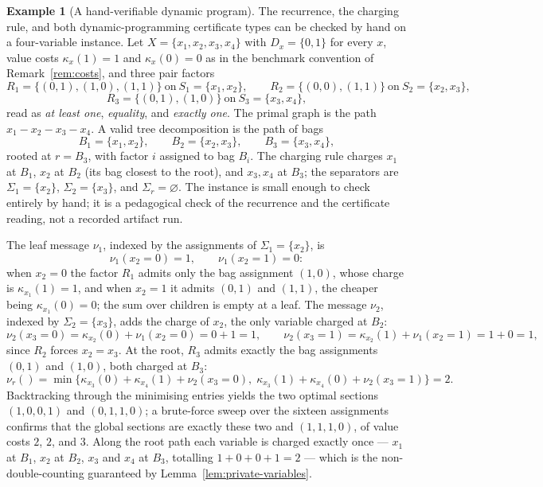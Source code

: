 \documentclass[11pt]{article}
\theoremstyle{plain}
\theoremstyle{definition}
\newtheorem{example}[theorem]{Example}
\theoremstyle{remark}
\begin{document}
\begin{example}[A hand-verifiable dynamic program]
\label{ex:dp-micro}
The recurrence, the charging rule, and both dynamic-programming certificate
types can be checked by hand on a four-variable instance.  Let
\(X=\{x_1,x_2,x_3,x_4\}\) with \(D_x=\{0,1\}\) for every \(x\), value
costs \(\kappa_x(1)=1\) and \(\kappa_x(0)=0\) as in the benchmark
convention of Remark~\ref{rem:costs}, and three pair factors
\[
  R_1=\{(0,1),(1,0),(1,1)\}\ \text{on}\ S_1=\{x_1,x_2\},
  \qquad
  R_2=\{(0,0),(1,1)\}\ \text{on}\ S_2=\{x_2,x_3\},
\]
\[
  R_3=\{(0,1),(1,0)\}\ \text{on}\ S_3=\{x_3,x_4\},
\]
read as \emph{at least one}, \emph{equality}, and \emph{exactly one}.  The
primal graph is the path \(x_1{-}x_2{-}x_3{-}x_4\).  A valid tree
decomposition is the path of bags
\[
  B_1=\{x_1,x_2\},\qquad B_2=\{x_2,x_3\},\qquad B_3=\{x_3,x_4\},
\]
rooted at \(r=B_3\), with factor \(i\) assigned to bag \(B_i\).  The
charging rule charges \(x_1\) at \(B_1\), \(x_2\) at \(B_2\) (its bag
closest to the root), and \(x_3,x_4\) at \(B_3\); the separators are
\(\Sigma_1=\{x_2\}\), \(\Sigma_2=\{x_3\}\), and \(\Sigma_r=\varnothing\).
The instance is small enough to check entirely by hand; it is a pedagogical
check of the recurrence and the certificate reading, not a recorded
artifact run.

The leaf message \(\nu_1\), indexed by the assignments of
\(\Sigma_1=\{x_2\}\), is
\[
  \nu_1(x_2{=}0)=1,\qquad \nu_1(x_2{=}1)=0:
\]
when \(x_2=0\) the factor \(R_1\) admits only the bag assignment
\((1,0)\), whose charge is \(\kappa_{x_1}(1)=1\), and when
\(x_2=1\) it admits \((0,1)\) and \((1,1)\), the cheaper being
\(\kappa_{x_1}(0)=0\); the sum over children is empty at a leaf.  The
message \(\nu_2\), indexed by \(\Sigma_2=\{x_3\}\), adds the charge of
\(x_2\), the only variable charged at \(B_2\):
\[
  \nu_2(x_3{=}0)=\kappa_{x_2}(0)+\nu_1(x_2{=}0)=0+1=1,
  \qquad
  \nu_2(x_3{=}1)=\kappa_{x_2}(1)+\nu_1(x_2{=}1)=1+0=1,
\]
since \(R_2\) forces \(x_2=x_3\).  At the root, \(R_3\) admits exactly the
bag assignments \((0,1)\) and \((1,0)\), both charged at \(B_3\):
\[
  \nu_r()=\min\bigl\{\kappa_{x_3}(0)+\kappa_{x_4}(1)+\nu_2(x_3{=}0),\;
  \kappa_{x_3}(1)+\kappa_{x_4}(0)+\nu_2(x_3{=}1)\bigr\}=2.
\]
Backtracking through the minimising entries yields the two optimal
sections \((1,0,0,1)\) and \((0,1,1,0)\); a brute-force sweep over the
sixteen assignments confirms that the global sections are exactly these
two and \((1,1,1,0)\), of value costs \(2\), \(2\), and \(3\).  Along the
root path each variable is charged exactly once --- \(x_1\) at \(B_1\),
\(x_2\) at \(B_2\), \(x_3\) and \(x_4\) at \(B_3\), totalling
\(1+0+0+1=2\) --- which is the non-double-counting guaranteed by
Lemma~\ref{lem:private-variables}.


\end{example}
\end{document}
